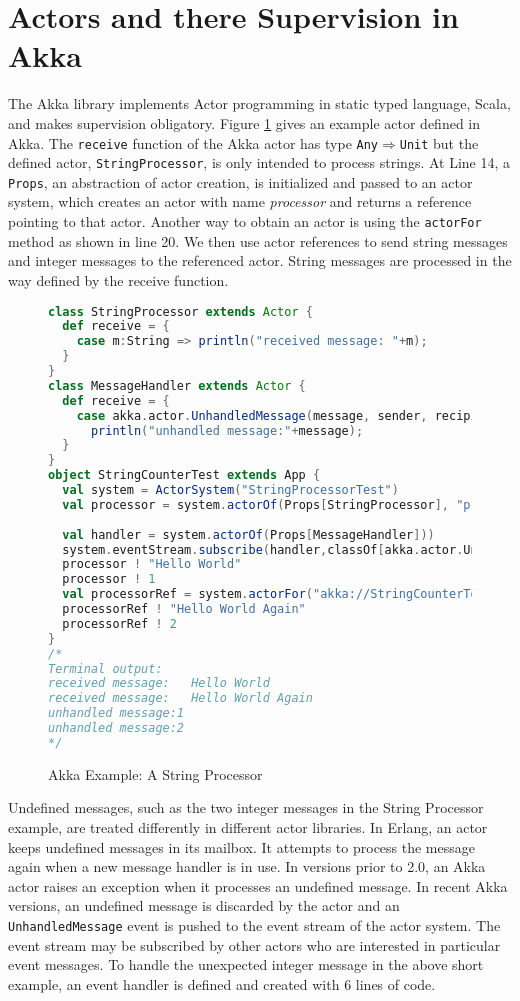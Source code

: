 \section{Actors and there Supervision in Akka}
\label{background}

The Akka library \citep{akka_doc} implements Actor programming in 
static typed language, Scala, and makes supervision obligatory.  Figure 
\ref{fig:akkastring} gives an example actor defined in Akka.  The {\tt receive} 
function of the Akka actor has type {\tt Any$\Rightarrow$Unit} but the 
defined actor, {\tt StringProcessor}, is only intended to process strings.  At 
Line 14, a {\tt Props}, an abstraction of actor creation, is initialized and 
passed to an actor system, which creates an actor with name  {\it processor} and 
returns a reference pointing to that actor.  Another way to obtain 
an actor is using the {\tt actorFor} method as shown in line 20.  We then use 
actor references to send string messages and integer messages to the 
referenced actor.  String messages are processed in the way defined by the 
receive function.

\begin{figure}[!h]
      \begin{lstlisting}[language=scala]
class StringProcessor extends Actor {
  def receive = {
    case m:String => println("received message: "+m);
  }
}
class MessageHandler extends Actor {
  def receive = {
    case akka.actor.UnhandledMessage(message, sender, recipient) =>
      println("unhandled message:"+message);
  }
}
object StringCounterTest extends App {
  val system = ActorSystem("StringProcessorTest")
  val processor = system.actorOf(Props[StringProcessor], "processor")
  
  val handler = system.actorOf(Props[MessageHandler]))
  system.eventStream.subscribe(handler,classOf[akka.actor.UnhandledMessage]);
  processor ! "Hello World"
  processor ! 1
  val processorRef = system.actorFor("akka://StringCounterTest/user/processor")
  processorRef ! "Hello World Again"
  processorRef ! 2
}
/*
Terminal output:
received message:	Hello World
received message:	Hello World Again
unhandled message:1
unhandled message:2
*/
    \end{lstlisting}
    \caption{Akka Example: A String Processor}
 \label{fig:akkastring}    
\end{figure}

Undefined messages, such as the two integer messages in the String Processor 
example, are treated differently in different actor libraries.  In
Erlang, an actor keeps undefined messages in its mailbox.  It attempts to 
process the message again when a new message handler is in use.  In versions 
prior to
2.0, an Akka actor raises an exception when it processes an undefined message.
In recent Akka versions, an undefined message is discarded by the actor and an
{\tt UnhandledMessage} event is pushed to the event stream of the actor system.
The event stream may be subscribed by other actors who are interested in
particular event messages.  To handle the unexpected integer message in the
above short example, an event handler is defined and created with 6 lines of 
code.

